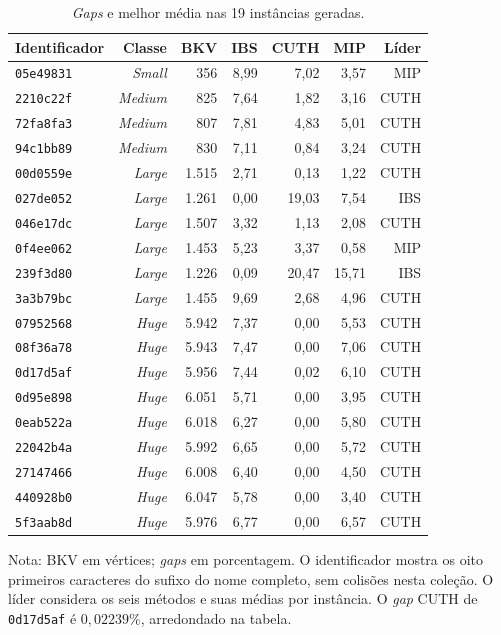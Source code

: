 \begin{table}[!htbp]
\centering
\caption{\textit{Gaps} e melhor média nas 19 instâncias geradas.}
\label{tab:res-geradas-desempenho}
\begin{singlespace}
\normalsize
\setlength{\tabcolsep}{5pt}
\renewcommand{\arraystretch}{1.15}
\begin{tabular}{lrrrrrr}
\hline\hline
\textbf{Identificador} & \textbf{Classe} & \textbf{BKV} & \textbf{IBS} & \textbf{CUTH} & \textbf{MIP} & \textbf{Líder} \\
\hline
\texttt{05e49831} & \textit{Small} & 356 & 8,99 & 7,02 & 3,57 & MIP \\
\texttt{2210c22f} & \textit{Medium} & 825 & 7,64 & 1,82 & 3,16 & CUTH \\
\texttt{72fa8fa3} & \textit{Medium} & 807 & 7,81 & 4,83 & 5,01 & CUTH \\
\texttt{94c1bb89} & \textit{Medium} & 830 & 7,11 & 0,84 & 3,24 & CUTH \\
\texttt{00d0559e} & \textit{Large} & 1.515 & 2,71 & 0,13 & 1,22 & CUTH \\
\texttt{027de052} & \textit{Large} & 1.261 & 0,00 & 19,03 & 7,54 & IBS \\
\texttt{046e17dc} & \textit{Large} & 1.507 & 3,32 & 1,13 & 2,08 & CUTH \\
\texttt{0f4ee062} & \textit{Large} & 1.453 & 5,23 & 3,37 & 0,58 & MIP \\
\texttt{239f3d80} & \textit{Large} & 1.226 & 0,09 & 20,47 & 15,71 & IBS \\
\texttt{3a3b79bc} & \textit{Large} & 1.455 & 9,69 & 2,68 & 4,96 & CUTH \\
\texttt{07952568} & \textit{Huge} & 5.942 & 7,37 & 0,00 & 5,53 & CUTH \\
\texttt{08f36a78} & \textit{Huge} & 5.943 & 7,47 & 0,00 & 7,06 & CUTH \\
\texttt{0d17d5af} & \textit{Huge} & 5.956 & 7,44 & 0,02 & 6,10 & CUTH \\
\texttt{0d95e898} & \textit{Huge} & 6.051 & 5,71 & 0,00 & 3,95 & CUTH \\
\texttt{0eab522a} & \textit{Huge} & 6.018 & 6,27 & 0,00 & 5,80 & CUTH \\
\texttt{22042b4a} & \textit{Huge} & 5.992 & 6,65 & 0,00 & 5,72 & CUTH \\
\texttt{27147466} & \textit{Huge} & 6.008 & 6,40 & 0,00 & 4,50 & CUTH \\
\texttt{440928b0} & \textit{Huge} & 6.047 & 5,78 & 0,00 & 3,40 & CUTH \\
\texttt{5f3aab8d} & \textit{Huge} & 5.976 & 6,77 & 0,00 & 6,57 & CUTH \\
\hline\hline
\end{tabular}
\par\smallskip
{\small Nota: BKV em vértices; \textit{gaps} em porcentagem. O identificador mostra os oito primeiros caracteres do sufixo do nome completo, sem colisões nesta coleção. O líder considera os seis métodos e suas médias por instância. O \textit{gap} CUTH de \texttt{0d17d5af} é $0{,}02239\%$, arredondado na tabela.\par}
{}
\end{singlespace}
\end{table}
